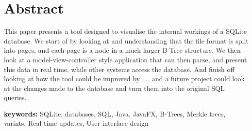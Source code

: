 \section*{\centering Abstract}
\begin{center}
	This paper presents a tool designed to visualise the internal workings of a SQLite database. We start of by 	   looking at and understanding that the file format is split into pages, and each page is a node in a much larger B-Tree structure. We then look at a model-view-controller style application that can then parse, and present this data in real time, while other systems access the database. And finish off looking at how the tool could be improved by .... and a future project could look at the changes made to the database and turn them into the original SQL queries. 
\end{center} 

\vspace{1.5cm}

\textbf{keywords:} SQLite, databases, SQL, Java, JavaFX, B-Trees, Merkle trees, varints, Real time updates, User interface design